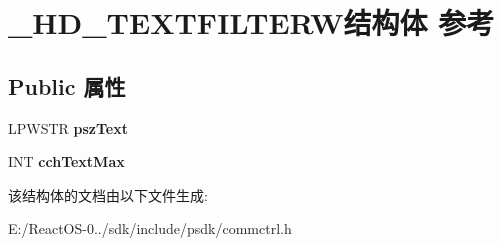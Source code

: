 \hypertarget{struct___h_d___t_e_x_t_f_i_l_t_e_r_w}{}\section{\+\_\+\+H\+D\+\_\+\+T\+E\+X\+T\+F\+I\+L\+T\+E\+R\+W结构体 参考}
\label{struct___h_d___t_e_x_t_f_i_l_t_e_r_w}
\subsection*{Public 属性}
\begin{DoxyCompactItemize}
\item 
\mbox{\label{struct___h_d___t_e_x_t_f_i_l_t_e_r_w_a62368984f8128645e1304f5c42cc9aa4}} 
L\+P\+W\+S\+TR {\bfseries psz\+Text}
\item 
\mbox{\label{struct___h_d___t_e_x_t_f_i_l_t_e_r_w_a0363a168a5f6c227974fa833f4d5e64a}} 
I\+NT {\bfseries cch\+Text\+Max}
\end{DoxyCompactItemize}


该结构体的文档由以下文件生成\+:\begin{DoxyCompactItemize}
\item 
E\+:/\+React\+O\+S-\/0../sdk/include/psdk/commctrl.\+h\end{DoxyCompactItemize}
